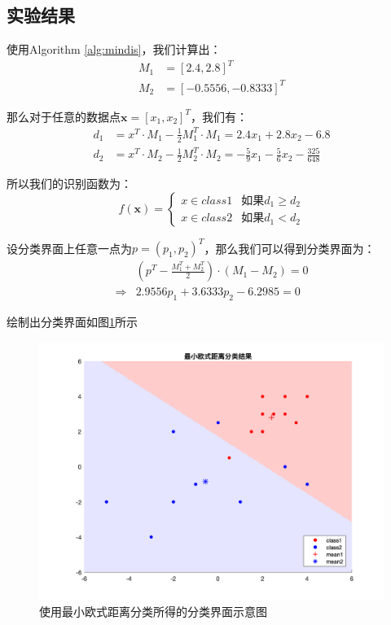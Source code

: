 \documentclass[cn]{elegantbook}
\begin{document}
\subsection{实验结果}
使用Algorithm \ref{alg:mindis}，我们计算出：
\begin{equation}
\begin{aligned}
M_1&=[2.4,2.8]^T \\
M_2&=[-0.5556,-0.8333]^T
\end{aligned}
\end{equation}

那么对于任意的数据点$\mathbf{x}=[x_1,x_2]^T$，我们有：
\begin{equation}
\begin{aligned}
d_1&=x^T\cdot M_1-\frac{1}{2}M_1^T\cdot M_1=2.4x_1+2.8x_2-6.8 \\
d_2&=x^T\cdot M_2-\frac{1}{2}M_2^T\cdot M_2=-\frac{5}{9}x_1-\frac{5}{6}x_2-\frac{325}{648}
\end{aligned}
\end{equation}

所以我们的识别函数为：
\begin{equation}
f(\mathbf{x})=\left\{
\begin{array}{cc}
x\in class1 & \mbox{如果}d_1\ge d_2 \\
x\in class2 & \mbox{如果}d_1<d_2
\end{array}
\right.
\end{equation}

设分类界面上任意一点为$p=(p_1,p_2)^T$，那么我们可以得到分类界面为：
\begin{equation}
\begin{aligned}
&\left(p^T-\frac{M_1^T+M_2^T}{2}\right)\cdot (M_1-M_2)=0 \\
\Rightarrow&2.9556p_1+3.6333p_2-6.2985=0
\end{aligned}
\end{equation}

绘制出分类界面如图\ref{res1}所示
\begin{figure}[!h]
	\centering
	\includegraphics[width=\textwidth]{../results/LD}
	\caption{\label{res1}使用最小欧式距离分类所得的分类界面示意图}
\end{figure}
\end{document}

